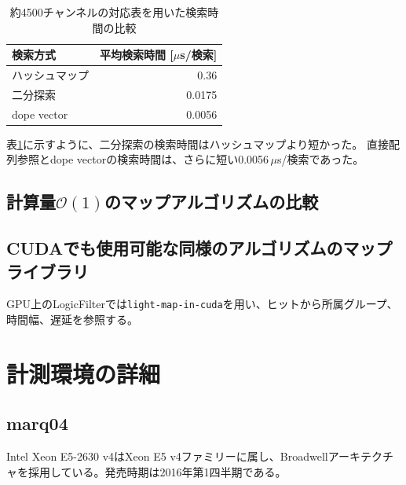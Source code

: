 \documentclass[../main.tex]{subfiles}
\begin{document}
\begin{table}[htbp]
  \centering
  \caption{約4500チャンネルの対応表を用いた検索時間の比較}
  \label{tab:channel-map-lookup}
  \begin{tabular}{lr}
    \hline
    検索方式 & 平均検索時間 [$\mu$s/検索] \\
    \hline
    ハッシュマップ & 0.36 \\
    二分探索 & 0.0175 \\
    dope vector & 0.0056 \\
    \hline
  \end{tabular}
\end{table}

表\ref{tab:channel-map-lookup}に示すように、二分探索の検索時間はハッシュマップより短かった。
直接配列参照とdope vectorの検索時間は、さらに短い0.0056\,$\mu$s/検索であった。

\subsection{計算量$\mathcal{O}(1)$のマップアルゴリズムの比較}

\subsection{CUDAでも使用可能な同様のアルゴリズムのマップライブラリ}
GPU上のLogicFilterでは\lstinline|light-map-in-cuda|を用い、ヒットから所属グループ、時間幅、遅延を参照する。


\section{計測環境の詳細}
\label{sec:appendixB}


\subsection{marq04}
\label{sec:environment-marq04}
Intel Xeon E5-2630 v4はXeon E5 v4ファミリーに属し、Broadwellアーキテクチャを採用している。発売時期は2016年第1四半期である。
\end{document}

